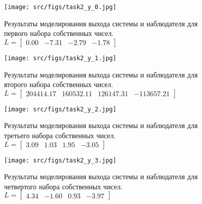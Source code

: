 \begin{figure}[ht!]
    \centering
    \texttt{[image: src/figs/task2\_y\_0.jpg]}
    \caption{Результаты моделирования выхода системы и наблюдателя для первого набора собственных чисел. \(L = \begin{bmatrix} 0.00 & -7.31 & -2.79 & -1.78 \end{bmatrix}\)}
    \label{fig:task2_y_1}
\end{figure}
\begin{figure}[ht!]
    \centering
    \texttt{[image: src/figs/task2\_y\_1.jpg]}
    \caption{Результаты моделирования выхода системы и наблюдателя для второго набора собственных чисел. \(L = \begin{bmatrix} 204414.17 &  160532.11 &  126147.31 & -113657.21 \end{bmatrix}\) }
    \label{fig:task2_y_2}
\end{figure}
\begin{figure}[ht!]
    \centering
    \texttt{[image: src/figs/task2\_y\_2.jpg]}
    \caption{Результаты моделирования выхода системы и наблюдателя для третьего набора собственных чисел. \(L = \begin{bmatrix} 3.09 &  1.03 &  1.95 & -3.05 \end{bmatrix}\)}
    \label{fig:task2_y_3}
\end{figure}
\begin{figure}[ht!]
    \centering
    \texttt{[image: src/figs/task2\_y\_3.jpg]}
    \caption{Результаты моделирования выхода системы и наблюдателя для четвертого набора собственных чисел. \(L = \begin{bmatrix} 4.34 & -1.60 &  0.93 & -3.97 \end{bmatrix}\)}
    \label{fig:task2_y_4}
\end{figure}

\FloatBarrier